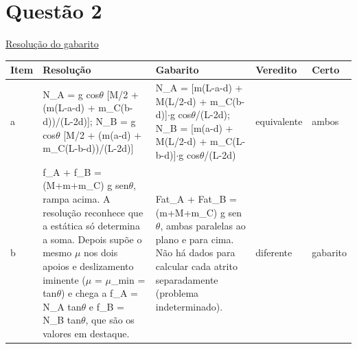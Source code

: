\documentclass{article}%
\begin{document}
\section*{Questão 2}%
\href{https://poliedroresolve.sistemapoliedro.com.br/vestibulares/ita/2026/ita-2-fase-dia-3-30-10-2025-2-fase-dia-3/dissertativa-2-fisica-2-fase-dia-3-ita-2026}{Resolução do gabarito}\par\smallskip%
\begin{longtable}{@{}p{} p{} p{} p{} p{}@{}}\toprule Item & Resolução & Gabarito & Veredito & Certo \\ \midrule
a & N\_A = g cos$\theta$ {[}M/2 + (m(L-a-d) + m\_C(b-d))/(L-2d){]}; N\_B = g cos$\theta$ {[}M/2 + (m(a-d) + m\_C(L-b-d))/(L-2d){]} & N\_A = {[}m(L-a-d) + M(L/2-d) + m\_C(b-d){]}$\cdot$g cos$\theta$/(L-2d); N\_B = {[}m(a-d) + M(L/2-d) + m\_C(L-b-d){]}$\cdot$g cos$\theta$/(L-2d) & equivalente & ambos \\
b & f\_A + f\_B = (M+m+m\_C) g sen$\theta$, rampa acima. A resolução reconhece que a estática só determina a soma. Depois supõe o mesmo $\mu$ nos dois apoios e deslizamento iminente ($\mu$ = $\mu$\_min = tan$\theta$) e chega a f\_A = N\_A tan$\theta$ e f\_B = N\_B tan$\theta$, que são os valores em destaque. & Fat\_A + Fat\_B = (m+M+m\_C) g sen$\theta$, ambas paralelas ao plano e para cima. Não há dados para calcular cada atrito separadamente (problema indeterminado). & diferente & gabarito \\
\bottomrule\end{longtable}%
\end{document}
